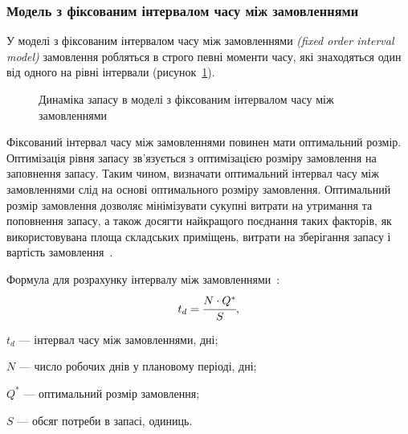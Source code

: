\subsubsection{Модель з фіксованим інтервалом часу між замовленнями}
У моделі з фіксованим інтервалом часу між замовленнями  \textit{(fixed order interval model)} замовлення робляться в строго певні моменти часу, які знаходяться один від одного на рівні інтервали (рисунок~\ref{fig:model_fi:dynamic}).

\begin{figure}[H]
  \centering
{}
  \captionsetup{justification=centering}
  \caption{Динаміка запасу в моделі з фіксованим інтервалом часу між замовленнями}
  \label{fig:model_fi:dynamic}
\end{figure}

Фіксований інтервал часу між замовленнями повинен мати оптимальний розмір. 
Оптимізація рівня запасу зв'язується з оптимізацією розміру замовлення на заповнення запасу. 
Таким чином, визначати оптимальний інтервал часу між замовленнями слід на основі оптимального розміру замовлення. 
Оптимальний розмір замовлення дозволяє мінімізувати сукупні витрати на утримання та поповнення запасу, а також досягти найкращого поєднання таких факторів, як використовувана площа складських приміщень, витрати на зберігання запасу і вартість замовлення~\cite{Sterligova2008}.

Формула для розрахунку інтервалу між замовленнями~\cite{Sterligova2008}:
\begin{equation} \label{eq:model_fi:time}
t_d=\cfrac{N\cdot Q^*}{S}
,
\end{equation}
\begin{description}
	\item[де] $t_d$ --- інтервал часу між замовленнями, дні;
	\item $N$ --- число робочих днів у плановому періоді, дні;
	\item $Q^*$ --- оптимальний розмір замовлення;
	\item $S$ --- обсяг потреби в запасі, одиниць.
\end{description}

